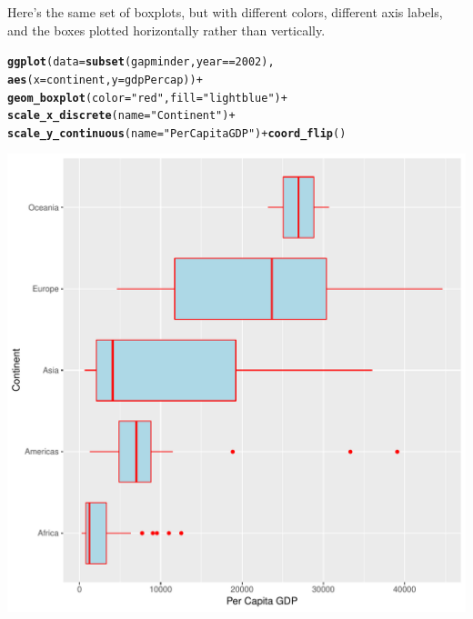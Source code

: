 \documentclass[12pt,oneside]{book}\usepackage[]{graphicx}\usepackage[]{color}
\makeatletter
\def\maxwidth{ %
  \ifdim\Gin@nat@width>\linewidth
    \linewidth
  \else
    \Gin@nat@width
  \fi
}
\newcommand{\hlnum}[1]{\textcolor[rgb]{0.686,0.059,0.569}{#1}}%
\newcommand{\hlstr}[1]{\textcolor[rgb]{0.192,0.494,0.8}{#1}}%
\newcommand{\hlopt}[1]{\textcolor[rgb]{0,0,0}{#1}}%
\newcommand{\hlstd}[1]{\textcolor[rgb]{0.345,0.345,0.345}{#1}}%
\newcommand{\hlkwc}[1]{\textcolor[rgb]{0.333,0.667,0.333}{#1}}%
\newcommand{\hlkwd}[1]{\textcolor[rgb]{0.737,0.353,0.396}{\textbf{#1}}}%
\newenvironment{kframe}{%
 \def\at@end@of@kframe{}%
 \ifinner\ifhmode%
  \def\at@end@of@kframe{\end{minipage}}%
  \begin{minipage}{\columnwidth}%
 \fi\fi%
 \def\FrameCommand##1{\hskip\@totalleftmargin \hskip-\fboxsep
 \colorbox{shadecolor}{##1}\hskip-\fboxsep
     \hskip-\linewidth \hskip-\@totalleftmargin \hskip\columnwidth}%
 \MakeFramed {\advance\hsize-\width
   \@totalleftmargin\z@ \linewidth\hsize
   \@setminipage}}%
 {\par\unskip\endMakeFramed%
 \at@end@of@kframe}
\newenvironment{knitrout}{}{} %
\makeatother
\begin{document}
Here's the same set of boxplots, but with different colors, different axis labels, and the boxes plotted horizontally rather than vertically.
\begin{knitrout}
\color{fgcolor}\begin{kframe}
\begin{alltt}
\hlkwd{ggplot}\hlstd{(}\hlkwc{data} \hlstd{=} \hlkwd{subset}\hlstd{(gapminder,  year} \hlopt{==} \hlnum{2002}\hlstd{),}
       \hlkwd{aes}\hlstd{(}\hlkwc{x} \hlstd{= continent,} \hlkwc{y} \hlstd{= gdpPercap))} \hlopt{+}
    \hlkwd{geom_boxplot}\hlstd{(}\hlkwc{color} \hlstd{=} \hlstr{"red"}\hlstd{,} \hlkwc{fill} \hlstd{=} \hlstr{"lightblue"}\hlstd{)} \hlopt{+}
    \hlkwd{scale_x_discrete}\hlstd{(}\hlkwc{name} \hlstd{=} \hlstr{"Continent"}\hlstd{)} \hlopt{+}
    \hlkwd{scale_y_continuous}\hlstd{(}\hlkwc{name} \hlstd{=} \hlstr{"Per Capita GDP"}\hlstd{)} \hlopt{+} \hlkwd{coord_flip}\hlstd{()}
\end{alltt}
\end{kframe}
\includegraphics[width=\maxwidth]{figure/unnamed-chunk-79-1} 

\end{knitrout}
\end{document}
